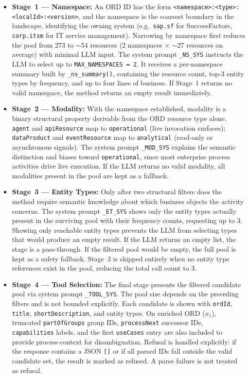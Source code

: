 \begin{itemize}
  \item \textbf{Stage~1 --- Namespace:} An ORD ID has the form \texttt{<namespace>:<type>:<localId>:<version>}, and the namespace is the coarsest boundary in the landscape, identifying the owning system (e.g.\ \texttt{sap.sf} for SuccessFactors, \texttt{corp.itsm} for IT service management). Narrowing by namespace first reduces the pool from 273 to $\sim$54 resources (2 namespaces $\times$ $\sim$27 resources on average) with minimal LLM input. The system prompt \texttt{\_NS\_SYS} instructs the LLM to select up to \texttt{MAX\_NAMESPACES = 2}. It receives a per-namespace summary built by \texttt{\_ns\_summary()}, containing the resource count, top-3 entity types by frequency, and up to four lines of business. If Stage~1 returns no valid namespace, the method returns an empty result immediately.

  \item \textbf{Stage~2 --- Modality:} With the namespace established, modality is a binary structural property derivable from the ORD resource type alone. \texttt{agent} and \texttt{apiResource} map to \texttt{operational} (live invocation surfaces); \texttt{dataProduct} and \texttt{eventResource} map to \texttt{analytical} (read-only or asynchronous signals). The system prompt \texttt{\_MOD\_SYS} explains the semantic distinction and biases toward \texttt{operational}, since most enterprise process activities drive live execution. If the LLM returns no valid modality, all modalities present in the pool are kept as a fallback.

  \item \textbf{Stage~3 --- Entity Types:} Only after two structural filters does the method require semantic knowledge about which business objects the activity concerns. The system prompt \texttt{\_ET\_SYS} shows only the entity types actually present in the surviving pool with their frequency counts, requesting up to 3. Showing only reachable entity types prevents the LLM from selecting types that would produce an empty result. If the LLM returns an empty list, the stage is a pass-through. If the filtered pool would be empty, the full pool is kept as a safety fallback. Stage~3 is skipped entirely when no entity type references exist in the pool, reducing the total call count to 3.

  \item \textbf{Stage~4 --- Tool Selection:} The final stage presents the filtered candidate pool via system prompt \texttt{\_TOOL\_SYS}. The pool size depends on the preceding filters and is not bounded explicitly. Each candidate is shown with \texttt{ordId}, \texttt{title}, \texttt{shortDescription}, and entity types. On enriched ORD ($x_1$), truncated \texttt{partOfGroups} group IDs, \texttt{processNext} successor IDs, \texttt{capabilities} labels, and the first \texttt{useCases} entry are also included to provide process-context for disambiguation. Refusal is handled explicitly: if the response contains a JSON \texttt{[]} or if all parsed IDs fall outside the valid candidate set, the result is marked as refused. A parse failure is not treated as refusal.
\end{itemize}

